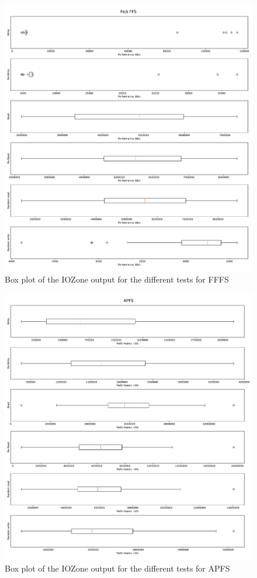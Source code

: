\begin{figure}[!htb]
	\label{fig:res_box_fffs}
	\begin{center}
		\includegraphics[width=1.0\textwidth]{figures/benchmarking/fake-ffs/Fejk FFS-box.pdf}
	\end{center}
	\caption{Box plot of the IOZone output for the different tests for \gls{FFFS}}
\end{figure}

\begin{figure}[!htb]
	\label{fig:res_box_apfs}
	\begin{center}
		\includegraphics[width=1.0\textwidth]{figures/benchmarking/local/APFS-box.pdf}
	\end{center}
	\caption{Box plot of the IOZone output for the different tests for \gls{APFS}}
\end{figure}